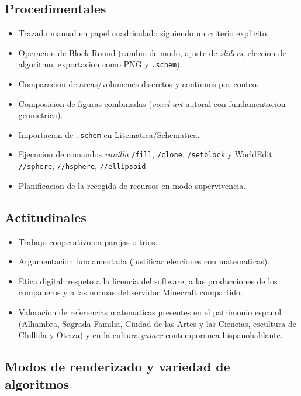 \documentclass[12pt,a4paper]{scrartcl}
\newcommand{\cmd}[1]{\textcolor{earth}{\texttt{\small #1}}}
\begin{document}
\subsection{Procedimentales}
\begin{itemize}[leftmargin=1.3em,itemsep=0.15em,topsep=0.3em]
  \item Trazado manual en papel cuadriculado siguiendo un criterio explicito.
  \item Operacion de Block Round (cambio de modo, ajuste de \emph{sliders}, eleccion de algoritmo, exportacion como PNG y \texttt{.schem}).
  \item Comparacion de areas/volumenes discretos y continuos por conteo.
  \item Composicion de figuras combinadas (\emph{voxel art} autoral con fundamentacion geometrica).
  \item Importacion de \texttt{.schem} en Litematica/Schematica.
  \item Ejecucion de comandos \emph{vanilla} \cmd{/fill}, \cmd{/clone}, \cmd{/setblock} y WorldEdit \cmd{//sphere}, \cmd{//hsphere}, \cmd{//ellipsoid}.
  \item Planificacion de la recogida de recursos en modo supervivencia.
\end{itemize}

\subsection{Actitudinales}
\begin{itemize}[leftmargin=1.3em,itemsep=0.15em,topsep=0.3em]
  \item Trabajo cooperativo en parejas o trios.
  \item Argumentacion fundamentada (justificar elecciones con matematicas).
  \item Etica digital: respeto a la licencia del software, a las producciones de los companeros y a las normas del servidor Minecraft compartido.
  \item Valoracion de referencias matematicas presentes en el patrimonio espanol (Alhambra, Sagrada Familia, Ciudad de las Artes y las Ciencias, escultura de Chillida y Oteiza) y en la cultura \emph{gamer} contemporanea hispanohablante.
\end{itemize}

\subsection{Modos de renderizado y variedad de algoritmos}
\end{document}
